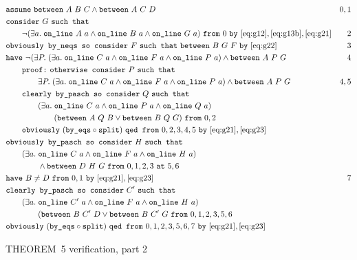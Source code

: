 \begin{boxedfigure}
\small
  \begin{align*}
    &\code{assume}\ \between{A}{B}{C} \wedge \between{A}{C}{D} & 0,1\\
    &\code{consider}\ G\ \code{such that}\\
    &\qquad\Triangle{a}{A}{B}{G}\ \code{from}\ 0\ \code{by}\ \eqref{eq:g12},\eqref{eq:g13b},\eqref{eq:g21}&2\\
    &\code{obviously by\_neqs so consider}\ F\ \code{such that}\ \between{B}{G}{F}\ \code{by}\ \eqref{eq:g22}&3\\
    &\code{have}\ \neg(\exists P.\; (\exists a.\;\code{on\_line}\ C\ a\wedge\code{on\_line}\ F\ a\wedge\code{on\_line}\ P\ a)\wedge\between{A}{P}{G} & 4\\
    &\qquad\code{proof:}\ \code{otherwise consider}\ P\ \code{such that}\\
    &\qquad\qquad \exists P.\; (\exists a.\;\code{on\_line}\ C\ a\wedge\code{on\_line}\ F\ a\wedge\code{on\_line}\ P\ a) \wedge\between{A}{P}{G}& 4,5\\
    &\qquad\code{clearly by\_pasch so consider}\ Q\ \code{such that}\\
    &\qquad\qquad(\exists a.\;\code{on\_line}\ C\ a\wedge\code{on\_line}\ P\ a\wedge\code{on\_line}\ Q\ a)\\
    &\qquad\qquad\qquad(\between{A}{Q}{B} \vee \between{B}{Q}{G})\ \code{from}\ 0,2\\
    &\qquad\code{obviously}\ (\code{by\_eqs}\circ\code{split})\ \code{qed from}\ 0,2,3,4,5\ \code{by}\ \eqref{eq:g21},\eqref{eq:g23}\\
    &\code{obviously by\_pasch so consider}\ H\ \code{such that}\\
    &\qquad(\exists a.\;\code{on\_line}\ C\ a\wedge\code{on\_line}\ F\ a\wedge\code{on\_line}\ H\ a)\\
    &\qquad\qquad\wedge\between{D}{H}{G}\ \code{from}\ 0,1,2,3\ \code{at}\ 5,6\\
    &\code{have}\ B\neq D\ \code{from}\ 0,1\ \code{by}\ \eqref{eq:g21},\eqref{eq:g23} & 7\\
    &\code{clearly by\_pasch so consider}\ C'\ \code{such that}\\
    &\qquad (\exists a.\;\code{on\_line}\ C'\ a\wedge\code{on\_line}\ F\ a\wedge\code{on\_line}\ H\ a)\\
    &\qquad\qquad(\between{B}{C'}{D} \vee \between{B}{C'}{G}\ \code{from}\ 0,1,2,3,5,6\\
    &\code{obviously}\ (\code{by\_eqs}\circ\code{split})\ \code{qed from}\ 0,1,2,3,5,6,7\ \code{by}\ \eqref{eq:g21},\eqref{eq:g23}
  \end{align*}
  \caption{THEOREM~5 verification, part 2}
  \label{fig:FiveVerification2}
\end{boxedfigure}

